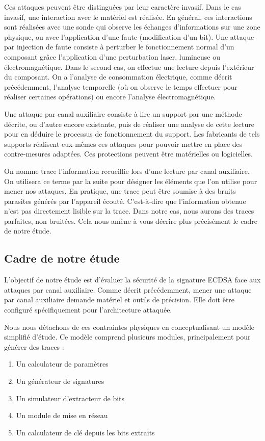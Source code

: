 \documentclass{backend}
\begin{document}
Ces attaques peuvent être distinguées par leur caractère invasif. Dans le cas invasif, une interaction avec le matériel est réalisée. En général, ces interactions sont réalisées avec une sonde qui observe les échanges d'informations sur une zone physique, ou avec l'application d'une faute (modification d'un bit). Une attaque par injection de faute consiste à perturber le fonctionnement normal d'un composant grâce l'application d'une perturbation laser, lumineuse ou électromagnétique.
Dans le second cas, on effectue une lecture depuis l'extérieur du composant. On a l'analyse de consommation électrique, comme décrit précédemment, l'analyse temporelle (où on observe le temps effectuer pour réaliser certaines opérations) ou encore l'analyse électromagnétique.\medbreak

Une attaque par canal auxiliaire consiste à lire un support par une méthode décrite, ou d'autre encore existante, puis de réaliser une analyse de cette lecture pour en déduire le processus de fonctionnement du support. Les fabricants de tels supports réalisent eux-mêmes ces attaques pour pouvoir mettre en place des contre-mesures adaptées. Ces protections peuvent être matérielles ou logicielles.

On nomme trace l'information recueillie lors d'une lecture par canal auxiliaire. On utilisera ce terme par la suite pour désigner les éléments que l'on utilise pour mener nos attaques. En pratique, une trace peut être soumise à des bruits parasites générés par l'appareil écouté. C'est-à-dire que l'information obtenue n'est pas directement lisible sur la trace. Dans notre cas, nous aurons des traces parfaites, non bruitées. Cela nous amène à vous décrire plus précisément le cadre de notre étude.

\subsection{Cadre de notre étude}

L'objectif de notre étude est d'évaluer la sécurité de la signature ECDSA face aux attaques par canal auxiliaire. Comme décrit précédemment, mener une attaque par canal auxiliaire demande matériel et outils de précision. Elle doit être configuré spécifiquement pour l'architecture attaquée.\medbreak

Nous nous détachons de ces contraintes physiques en conceptualisant un modèle simplifié d'étude. Ce modèle comprend plusieurs modules, principalement pour générer des traces :

\begin{multicols}{2}
    \begin{enumerate}
    \item[1 -] Un calculateur de paramètres
    \item[1 -] Un générateur de signatures
    \item[1 -] Un simulateur d'extracteur de bits
    \item[2 -] Un module de mise en réseau
    \item[2 -] Un calculateur de clé depuis les bits extraits
    \end{enumerate}
\end{multicols}
\end{document}
